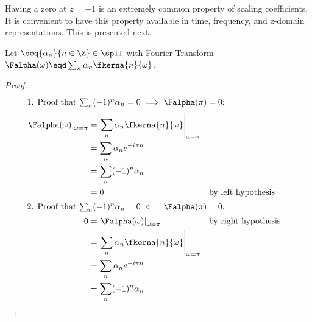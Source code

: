 Having a zero at $z=-1$ is an extremely common property of
scaling coefficients.
It is convenient to have this property
available in time, frequency, and z-domain representations.
This is presented next.
\begin{lemma}
\label{lem:twz}
Let $\seq{\alpha_n}{n\in\Z}\in\spII$
with Fourier Transform $\Falpha(\omega)\eqd\sum_n \alpha_n \fkerna{n}{\omega}$.
\end{lemma}
\begin{proof}
\begin{align*}
\intertext{1. Proof that $\sum_n (-1)^n \alpha_n = 0  \implies \Falpha(\pi)=0$:}
  \left.\Falpha(\omega)\right|_{\omega=\pi}
    &= \left.\sum_n \alpha_n  \fkerna{n}{\omega}\right|_{\omega=\pi}
  \\&= \sum_n \alpha_n e^{-i\pi n}
  \\&= \sum_n (-1)^n \alpha_n
  \\&= 0
    && \text{by left hypothesis}
\\
\intertext{2. Proof that $\sum_n (-1)^n \alpha_n = 0  \impliedby \Falpha(\pi)=0$:}
  0
    &= \left.\Falpha(\omega)\right|_{\omega=\pi}
    && \text{by right hypothesis}
  \\&= \left.\sum_n \alpha_n  \fkerna{n}{\omega}\right|_{\omega=\pi}
  \\&= \sum_n \alpha_n  e^{-i\pi n}
  \\&= \sum_n (-1)^n \alpha_n
\end{align*}
\end{proof}

